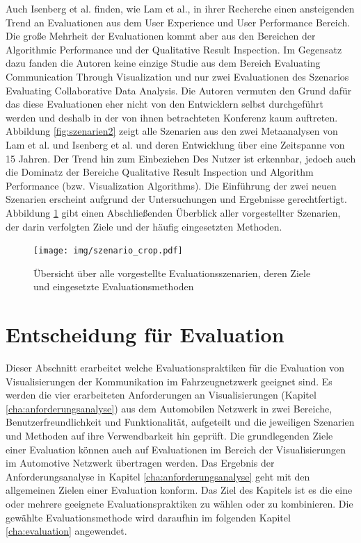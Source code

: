 \documentclass[draft=false
              ,paper=a4
              ,twoside=false
              ,fontsize=11pt
              ,headsepline
              ,BCOR10mm
              ,DIV11
              ]{scrbook}
\begin{document}
Auch Isenberg et al. finden, wie Lam et al., in ihrer Recherche einen ansteigenden Trend an Evaluationen aus dem User Experience und User Performance Bereich. Die große Mehrheit der Evaluationen kommt aber aus den Bereichen der Algorithmic Performance und der Qualitative Result Inspection. Im Gegensatz dazu fanden die Autoren keine einzige Studie aus dem Bereich Evaluating Communication Through Visualization und nur zwei Evaluationen des Szenarios Evaluating Collaborative Data Analysis. Die Autoren vermuten den Grund dafür das diese Evaluationen eher nicht von den Entwicklern selbst durchgeführt werden und deshalb in der von ihnen betrachteten Konferenz kaum auftreten. Abbildung \ref{fig:szenarien2} zeigt alle Szenarien aus den zwei Metaanalysen von Lam et al. und Isenberg et al. und deren Entwicklung über eine Zeitspanne von 15 Jahren. Der Trend hin zum Einbeziehen Des Nutzer ist erkennbar, jedoch auch die Dominatz der Bereiche Qualitative Result Inspection und Algorithm Performance (bzw. Visualization Algorithms). Die Einführung der zwei neuen Szenarien erscheint aufgrund der Untersuchungen und Ergebnisse gerechtfertigt. Abbildung \ref{fig:szenarienübersicht} gibt einen Abschließenden Überblick aller vorgestellter Szenarien, der darin verfolgten Ziele und der häufig eingesetzten Methoden.

\begin{figure}[htbp]
  \centering
  \texttt{[image: img/szenario\_crop.pdf]}
  \caption{Übersicht über alle vorgestellte Evaluationsszenarien, deren Ziele und eingesetzte Evaluationsmethoden}
  \label{fig:szenarienübersicht}
\end{figure}


\section{Entscheidung für Evaluation} %
\label{sec:entscheidung_für_Evaluation}
Dieser Abschnitt erarbeitet welche Evaluationspraktiken für die Evaluation von Visualisierungen der Kommunikation im Fahrzeugnetzwerk geeignet sind. Es werden die vier erarbeiteten Anforderungen an Visualisierungen (Kapitel \ref{cha:anforderungsanalyse}) aus dem Automobilen Netzwerk in zwei Bereiche, Benutzerfreundlichkeit und Funktionalität, aufgeteilt und die jeweiligen Szenarien und Methoden auf ihre Verwendbarkeit hin geprüft. Die grundlegenden Ziele einer Evaluation können auch auf Evaluationen im Bereich der Visualisierungen im Automotive Netzwerk übertragen werden. Das Ergebnis der Anforderungsanalyse in Kapitel \ref{cha:anforderungsanalyse} geht mit den allgemeinen Zielen einer Evaluation konform. Das Ziel des Kapitels ist es die eine oder mehrere geeignete Evaluationspraktiken zu wählen oder zu kombinieren. Die gewählte Evaluationsmethode wird daraufhin im folgenden Kapitel \ref{cha:evaluation} angewendet.  
\end{document}

